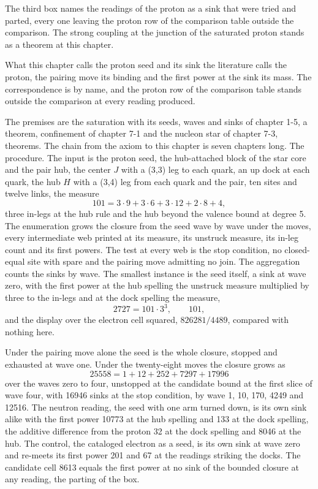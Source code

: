The third box names the readings of the proton as a sink that were tried and parted, every one leaving the proton row of the comparison table outside the comparison. The strong coupling at the junction of the saturated proton stands as a theorem at this chapter.
\begin{chbridge}
What this chapter calls the proton seed and its sink the literature calls the proton, the pairing move its binding and the first power at the sink its mass. The correspondence is by name, and the proton row of the comparison table stands outside the comparison at every reading produced.
\end{chbridge}
\begin{chproof}
The premises are the saturation with its seeds, waves and sinks of chapter 1-5, a theorem, confinement of chapter 7-1 and the nucleon star of chapter 7-3, theorems. The chain from the axiom to this chapter is seven chapters long. The procedure. The input is the proton seed, the hub-attached block of the star core and the pair hub, the center $J$ with a (3,3) leg to each quark, an up dock at each quark, the hub $H$ with a (3,4) leg from each quark and the pair, ten sites and twelve links, the measure
\begin{equation}
101 = 3 \cdot 9 + 3 \cdot 6 + 3 \cdot 12 + 2 \cdot 8 + 4 ,
\end{equation}
three in-legs at the hub rule and the hub beyond the valence bound at degree 5. The enumeration grows the closure from the seed wave by wave under the moves, every intermediate web printed at its measure, its unstruck measure, its in-leg count and its first powers. The test at every web is the stop condition, no closed-equal site with spare and the pairing move admitting no join. The aggregation counts the sinks by wave. The smallest instance is the seed itself, a sink at wave zero, with the first power at the hub spelling the unstruck measure multiplied by three to the in-legs and at the dock spelling the measure,
\begin{equation}
2727 = 101 \cdot 3^{3}, \qquad 101 ,
\end{equation}
and the display over the electron cell squared, $826281/4489$, compared with nothing here.

Under the pairing move alone the seed is the whole closure, stopped and exhausted at wave one. Under the twenty-eight moves the closure grows as
\begin{equation}
25558 = 1 + 12 + 252 + 7297 + 17996
\end{equation}
over the waves zero to four, unstopped at the candidate bound at the first slice of wave four, with 16946 sinks at the stop condition, by wave 1, 10, 170, 4249 and 12516. The neutron reading, the seed with one arm turned down, is its own sink alike with the first power 10773 at the hub spelling and 133 at the dock spelling, the additive difference from the proton 32 at the dock spelling and 8046 at the hub. The control, the cataloged electron as a seed, is its own sink at wave zero and re-meets its first power 201 and 67 at the readings striking the docks. The candidate cell 8613 equals the first power at no sink of the bounded closure at any reading, the parting of the box.


\end{chproof}
